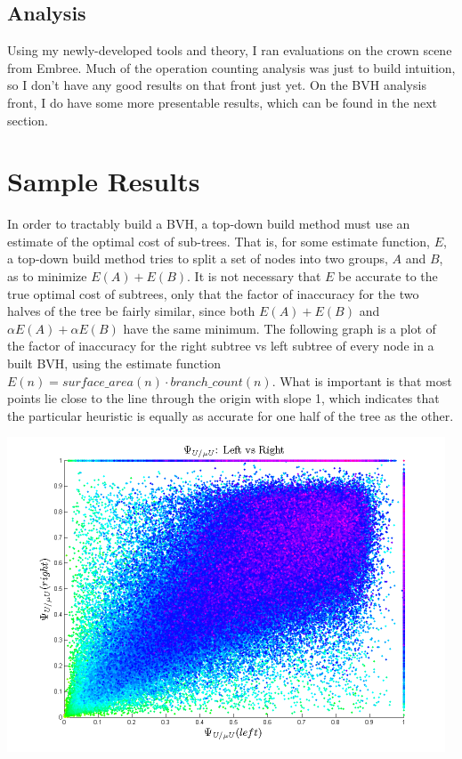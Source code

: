 \documentclass{article}
\begin{document}
\subsection{Analysis}
Using my newly-developed tools and theory, I ran evaluations on the crown scene from Embree.  Much of the operation counting analysis was just to build intuition, so I don't have any good results on that front just yet.  On the BVH analysis front, I do have some more presentable results, which can be found in the next section.
\section{Sample Results}
In order to tractably build a BVH, a top-down build method must use an estimate of the optimal cost of sub-trees.  That is, for some estimate function, $E$, a top-down build method tries to split a set of nodes into two groups, $A$ and $B$, as to minimize $E(A)+E(B)$.  It is not necessary that $E$ be accurate to the true optimal cost of subtrees, only that the factor of inaccuracy for the two halves of the tree be fairly similar, since both $E(A)+E(B)$ and $\alpha E(A)+\alpha E(B)$ have the same minimum.  The following graph is a plot of the factor of inaccuracy for the right subtree vs left subtree of every node in a built BVH, using the estimate function $E(n) = \mathit{surface\_area}(n) \cdot \mathit{branch\_count}(n)$.  What is important is that most points lie close to the line through the origin with slope 1, which indicates that the particular heuristic is equally as accurate for one half of the tree as the other.

\includegraphics{fig4.png}
\end{document}
